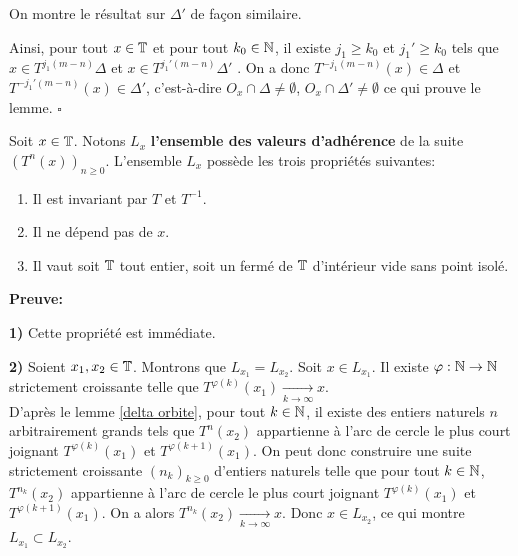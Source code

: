 	\par On montre le résultat sur $\Delta'$ de façon similaire.
	\par Ainsi, pour tout $x \in {\mathbb{T}}$ et pour tout $k_0 \in {\mathbb{N}}$,  il existe $j_1 \geq k_0$ et $j_1'\geq k_0$ tels que $x \in  T^{j_1(m-n)}\Delta$ et $x\in T^{j_1'(m-n)}\Delta'$ . On a donc $T^{-j_1(m-n)}(x) \in \Delta$ et $T^{-j_1'(m-n)}(x) \in \Delta'$, c'est-à-dire $O_x \cap \Delta \neq \emptyset$, $O_x \cap \Delta' \neq \emptyset$ ce qui prouve le lemme. \hfill $\square$\\
















\begin{theorem}\label{ensemble dérivé}
	Soit $x \in {\mathbb{T}}$. Notons $L_x$ \textbf{l'ensemble des valeurs d'adhérence} de la suite $(T^n(x))_{n\geq0}$. L'ensemble $L_x$ possède les trois propriétés suivantes:
	\begin{enumerate}
			\item Il est invariant par $T$ et $T^{-1}$.
			\item Il ne dépend pas de $x$.
			\item Il vaut soit ${\mathbb{T}}$ tout entier, soit un fermé de ${\mathbb{T}}$ d'intérieur vide sans point isolé.
	\end{enumerate}
\end{theorem}

	\textbf{Preuve:}
	\par \textbf{1)} Cette propriété est immédiate.\\


	\par \textbf{2)} Soient $x_1, x_2 \in {\mathbb{T}}$. Montrons que $L_{x_1}=L_{x_2}$. Soit $x \in L_{x_1}$. Il existe $\varphi:{\mathbb{N}} \to {\mathbb{N}}$ strictement croissante telle que $T^{\varphi(k)}(x_1) \underset{k \to \infty}{\longrightarrow}x$.\\

	D'après le lemme \ref{delta orbite}, pour tout $k\in {\mathbb{N}}$, il existe des entiers naturels $n$ arbitrairement grands tels que $T^{n}(x_2)$ appartienne à l'arc de cercle le plus court joignant $T^{\varphi(k)}(x_1)$ et $T^{\varphi(k+1)}(x_1)$. On peut donc construire une suite strictement croissante $(n_k)_{k\geq0}$ d'entiers naturels telle que pour tout $k \in {\mathbb{N}}$, $T^{n_k}(x_2)$ appartienne à l'arc de cercle le plus court joignant $T^{\varphi(k)}(x_1)$ et $T^{\varphi(k+1)}(x_1)$. On a alors $T^{n_k}(x_2) \underset{k \to \infty}{\longrightarrow}x$. Donc $x\in L_{x_2}$, ce qui montre $L_{x_1}\subset L_{x_2}$.\\

